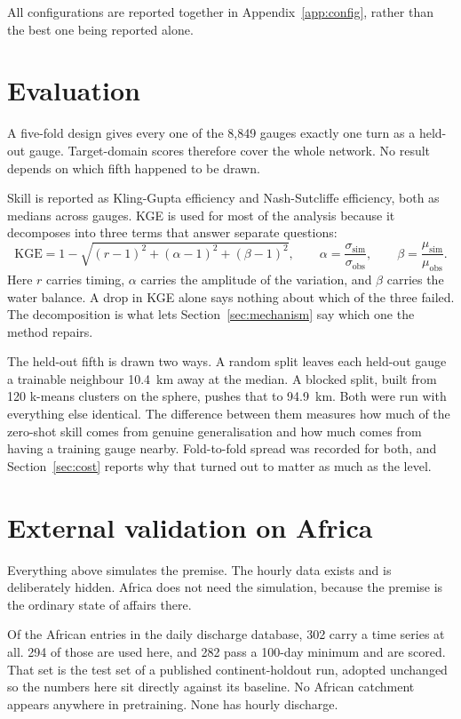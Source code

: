 \documentclass[11pt,a4paper]{article}
\begin{document}
All configurations are reported together in Appendix~\ref{app:config}, rather than the best one being reported alone.

\section{Evaluation}\label{sec:evaluation}
A five-fold design gives every one of the 8,849 gauges exactly one turn as a held-out gauge. Target-domain scores therefore cover the whole network. No result depends on which fifth happened to be drawn.

Skill is reported as Kling-Gupta efficiency and Nash-Sutcliffe efficiency, both as medians across gauges. KGE is used for most of the analysis because it decomposes into three terms that answer separate questions:
\begin{equation}
  \mathrm{KGE} = 1 - \sqrt{(r-1)^2 + (\alpha-1)^2 + (\beta-1)^2},
  \qquad \alpha = \frac{\sigma_{\mathrm{sim}}}{\sigma_{\mathrm{obs}}},
  \qquad \beta = \frac{\mu_{\mathrm{sim}}}{\mu_{\mathrm{obs}}}.
\end{equation}
Here $r$ carries timing, $\alpha$ carries the amplitude of the variation, and $\beta$ carries the water balance. A drop in KGE alone says nothing about which of the three failed. The decomposition is what lets Section~\ref{sec:mechanism} say which one the method repairs.

The held-out fifth is drawn two ways. A random split leaves each held-out gauge a trainable neighbour \SI{10.4}{\km} away at the median. A blocked split, built from \num{120} k-means clusters on the sphere, pushes that to \SI{94.9}{\km}. Both were run with everything else identical. The difference between them measures how much of the zero-shot skill comes from genuine generalisation and how much comes from having a training gauge nearby. Fold-to-fold spread was recorded for both, and Section~\ref{sec:cost} reports why that turned out to matter as much as the level.

\section{External validation on Africa}\label{sec:africa-design}
Everything above simulates the premise. The hourly data exists and is deliberately hidden. Africa does not need the simulation, because the premise is the ordinary state of affairs there.

Of the African entries in the daily discharge database, \num{302} carry a time series at all. \num{294} of those are used here, and \num{282} pass a \num{100}-day minimum and are scored. That set is the test set of a published continent-holdout run, adopted unchanged so the numbers here sit directly against its baseline. No African catchment appears anywhere in pretraining. None has hourly discharge.
\end{document}
